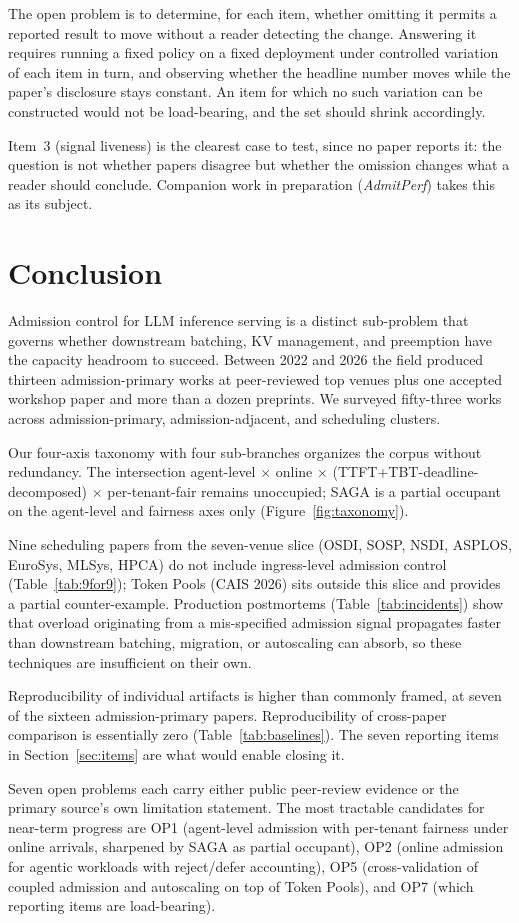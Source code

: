\documentclass[11pt,letterpaper]{article}
\theoremstyle{definition}
\begin{document}
The open problem is to determine, for each item, whether omitting it
permits a reported result to move without a reader detecting the
change. Answering it requires running a fixed policy on a fixed
deployment under controlled variation of each item in turn, and
observing whether the headline number moves while the paper's
disclosure stays constant. An item for which no such variation can be
constructed would not be load-bearing, and the set should shrink
accordingly.

Item~3 (signal liveness) is the clearest case to test, since no paper
reports it: the question is not whether papers disagree but whether the
omission changes what a reader should conclude. Companion work in
preparation (\emph{AdmitPerf}) takes this as its subject.

\section{Conclusion}
\label{sec:conc}

Admission control for LLM inference serving is a distinct sub-problem
that governs whether downstream batching, KV management, and
preemption have the capacity headroom to succeed. Between 2022 and
2026 the field produced thirteen admission-primary works at
peer-reviewed top venues plus one accepted workshop paper and more
than a dozen preprints. We surveyed fifty-three works across
admission-primary, admission-adjacent, and scheduling clusters.

Our four-axis taxonomy with four sub-branches organizes the corpus
without redundancy. The intersection agent-level $\times$ online
$\times$ (TTFT+TBT-deadline-decomposed) $\times$ per-tenant-fair
remains unoccupied; SAGA is a partial occupant on the agent-level
and fairness axes only (Figure~\ref{fig:taxonomy}).

Nine scheduling papers from the seven-venue slice (OSDI, SOSP,
NSDI, ASPLOS, EuroSys, MLSys, HPCA) do not include ingress-level
admission
control (Table~\ref{tab:9for9}); Token Pools (CAIS 2026) sits
outside this slice and provides a partial counter-example.
Production postmortems
(Table~\ref{tab:incidents}) show that overload originating from a
mis-specified admission signal propagates faster than downstream
batching, migration, or autoscaling can absorb, so these techniques
are insufficient on their own.

Reproducibility of individual artifacts is higher than commonly
framed, at seven of the sixteen admission-primary papers.
Reproducibility of cross-paper comparison is essentially zero
(Table~\ref{tab:baselines}). The seven reporting items in
Section~\ref{sec:items} are what would enable closing it.

Seven open problems each carry either public peer-review evidence or
the primary source's own limitation statement. The most tractable
candidates for near-term progress are OP1 (agent-level admission
with per-tenant fairness under online arrivals, sharpened by SAGA
as partial occupant), OP2 (online admission for agentic workloads
with reject/defer accounting), OP5 (cross-validation of coupled
admission and autoscaling on top of Token Pools), and OP7 (which
reporting items are load-bearing).



\end{document}
